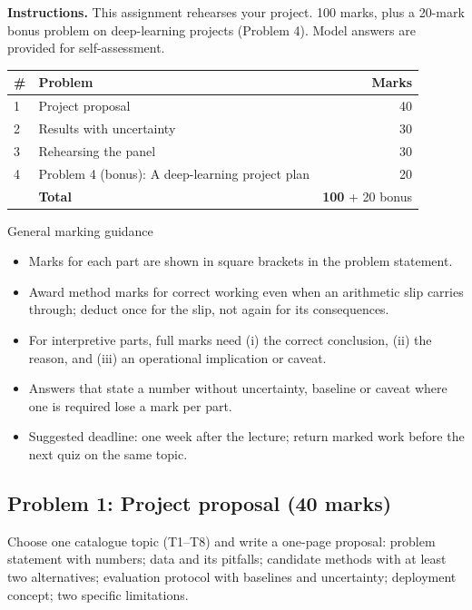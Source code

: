 \documentclass[11pt]{article}
\begin{document}
\textbf{Instructions.} This assignment rehearses your project. 100 marks, plus a 20-mark bonus problem on deep-learning projects (Problem 4). Model answers are provided for self-assessment.

\begin{center}\small\renewcommand{\arraystretch}{1.25}\begin{tabularx}{0.85\textwidth}{@{}l X r@{}}\toprule\textbf{\#} & \textbf{Problem} & \textbf{Marks}\\\midrule1 & Project proposal & 40\\
2 & Results with uncertainty & 30\\
3 & Rehearsing the panel & 30\\
4 & Problem 4 (bonus): A deep-learning project plan & 20\\\midrule & \textbf{Total} & \textbf{100} + 20 bonus\\\bottomrule\end{tabularx}\end{center}

\begin{instr}{General marking guidance}\begin{itemize}
\item Marks for each part are shown in square brackets in the problem statement.
\item Award method marks for correct working even when an arithmetic slip carries through; deduct once for the slip, not again for its consequences.
\item For interpretive parts, full marks need (i) the correct conclusion, (ii) the reason, and (iii) an operational implication or caveat.
\item Answers that state a number without uncertainty, baseline or caveat where one is required lose a mark per part.
\item Suggested deadline: one week after the lecture; return marked work before the next quiz on the same topic.
\end{itemize}\end{instr}

\subsection{Problem 1: Project proposal \normalfont\small\color{GreyN}(40 marks)}

\begin{prob}Choose one catalogue topic (T1--T8) and write a one-page proposal: problem statement with numbers; data and its pitfalls; candidate methods with at least two alternatives; evaluation protocol with baselines and uncertainty; deployment concept; two specific limitations.\end{prob}
\end{document}
